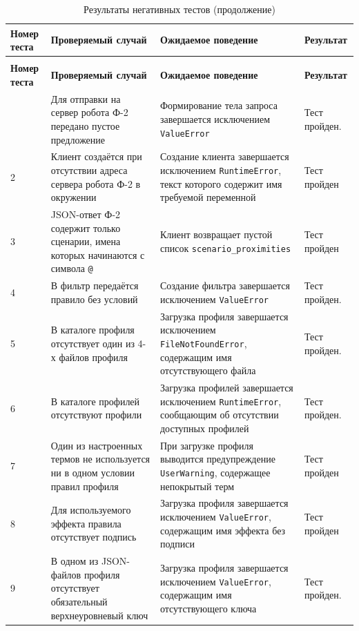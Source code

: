 \begin{longtable}{|p{}|p{}|p{}|p{}|}
	\caption{Результаты негативных тестов}
	\label{tbl:negative_functional_test_results} \\
	\hline
	\textbf{Номер теста} & \textbf{Проверяемый случай} & \textbf{Ожидаемое поведение} & \textbf{Результат} \\
	\hline
	\endfirsthead
	\caption[]{Результаты негативных тестов (продолжение)} \\
	\hline
	\textbf{Номер теста} & \textbf{Проверяемый случай} & \textbf{Ожидаемое поведение} & \textbf{Результат} \\
	\hline
	\endhead
	\hline
	\endfoot
	\endlastfoot
	1 & Для отправки на сервер робота Ф-2 передано пустое предложение &
	Формирование тела запроса завершается исключением \texttt{ValueError} &
	Тест пройден. \\
	\hline
	2 & Клиент создаётся при отсутствии адреса сервера робота Ф-2 в окружении &
	Создание клиента завершается исключением \texttt{RuntimeError}, текст
	которого содержит имя требуемой переменной & Тест пройден \\
	\hline
	3 & JSON-ответ Ф-2 содержит только сценарии, имена которых начинаются
	с символа \texttt{@} & Клиент возвращает пустой список
	\texttt{scenario\_proximities} & Тест пройден \\
	\hline
	4 & В фильтр передаётся правило без условий & Создание фильтра
	завершается исключением \texttt{ValueError} & Тест пройден. \\
	\hline
	5 & В каталоге профиля отсутствует один из 4-х файлов профиля &
	Загрузка профиля завершается исключением
	\texttt{FileNotFoundError}, содержащим имя отсутствующего файла &
	Тест пройден. \\
	\hline
	6 & В каталоге профилей отсутствуют профили &
	Загрузка профилей завершается исключением \texttt{RuntimeError},
	сообщающим об отсутствии доступных профилей & Тест пройден. \\
	\hline
	7 & Один из настроенных термов не используется ни в одном условии
	правил профиля & При загрузке профиля выводится предупреждение \texttt{UserWarning}, содержащее
	непокрытый терм & Тест пройден \\
	\hline
	8 & Для используемого эффекта правила отсутствует подпись &
	Загрузка профиля завершается исключением \texttt{ValueError},
	содержащим имя эффекта без подписи & Тест пройден \\
	\hline
	9 & В одном из JSON-файлов профиля отсутствует обязательный
	верхнеуровневый ключ & Загрузка профиля завершается исключением
	\texttt{ValueError}, содержащим имя отсутствующего ключа &
	Тест пройден. \\
	\hline
\end{longtable}


